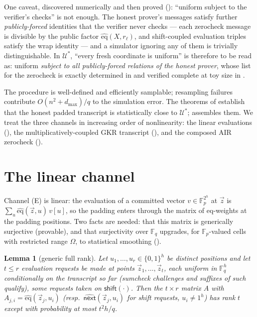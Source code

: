 \documentclass{article}
\newcommand{\Fp}{\mathbb{F}_p}
\newcommand{\Fq}{\mathbb{F}_q}
\newcommand{\eqf}{\widehat{\mathrm{eq}}}
\newtheorem{lemma}[theorem]{Lemma}
\theoremstyle{definition}
\begin{document}
One caveat, discovered numerically and then proved (): ``uniform subject to the verifier's checks'' is not enough. The honest prover's messages satisfy further \emph{publicly-forced} identities that the verifier never checks --- each zerocheck message is divisible by the public factor $\eqf(X, r_\ell)$, and shift-coupled evaluation triples satisfy the wrap identity --- and a simulator ignoring any of them is trivially distinguishable. In $\mathcal{U}^*$, ``every fresh coordinate is uniform'' is therefore to be read as: uniform \emph{subject to all publicly-forced relations of the honest prover}, whose list for the zerocheck is exactly determined in  and verified complete at toy size in .

The procedure is well-defined and efficiently samplable; resampling failures contribute $O(n^2 + d_{\max})/q$ to the simulation error. The theorems of  establish that the honest padded transcript is statistically close to $\mathcal{U}^*$;  assembles them. We treat the three channels in increasing order of nonlinearity: the linear evaluations (), the multiplicatively-coupled GKR transcript (), and the composed AIR zerocheck ().

\section{The linear channel}\label{sec:linear}

Channel (E) is linear: the evaluation of a committed vector $v \in \Fp^{2^h}$ at $\vec z$ is $\sum_u \eqf(\vec z, u)\, v[u]$, so the padding enters through the matrix of eq-weights at the padding positions. Two facts are needed: that this matrix is generically surjective (provable), and that surjectivity over $\Fq$ upgrades, for $\Fp$-valued cells with restricted range $\Omega$, to statistical smoothing ().

\begin{lemma}[generic full rank]\label{lem:rank-eval}
Let $u_1, \dots, u_r \in \{0,1\}^h$ be distinct positions and let $t \leq r$ evaluation requests be made at points $\vec z_1, \dots, \vec z_t$, each uniform in $\Fq^h$ conditionally on the transcript so far (sumcheck challenges and suffixes of such qualify), some requests taken on $\mathsf{shift}(\cdot)$. Then the $t \times r$ matrix $A$ with $A_{j,i} = \eqf(\vec z_j, u_i)$ (resp.\ $\widehat{\mathsf{next}}(\vec z_j, u_i)$ for shift requests, $u_i \neq 1^h$) has rank $t$ except with probability at most $t^2 h / q$.
\end{lemma}
\end{document}
